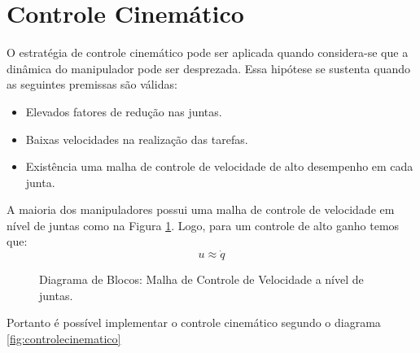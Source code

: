\section{Controle Cinemático} \label{sec:controle_cinematico}
O estratégia de controle cinemático pode ser aplicada quando considera-se que a dinâmica do manipulador pode ser desprezada. Essa hipótese se sustenta quando as seguintes premissas são válidas:
\begin{itemize}
\item Elevados fatores de redução nas juntas.
\item Baixas velocidades na realização das tarefas.
\item Existência uma malha de controle de velocidade de alto desempenho em cada junta.
\end{itemize}

A maioria dos manipuladores possui uma malha de controle de velocidade em nível de juntas como na Figura \ref{fig:controlejuntas}. Logo, para um controle de alto ganho temos que:
\[ {u} \approx \dot{{q}}\]

\begin{figure}[h!]
\centering
{}
\caption{Diagrama de Blocos: Malha de Controle de Velocidade a nível de juntas.}
\label{fig:controlejuntas}
\end{figure}


Portanto é possível implementar o controle cinemático segundo o diagrama \ref{fig:controlecinematico} 	

